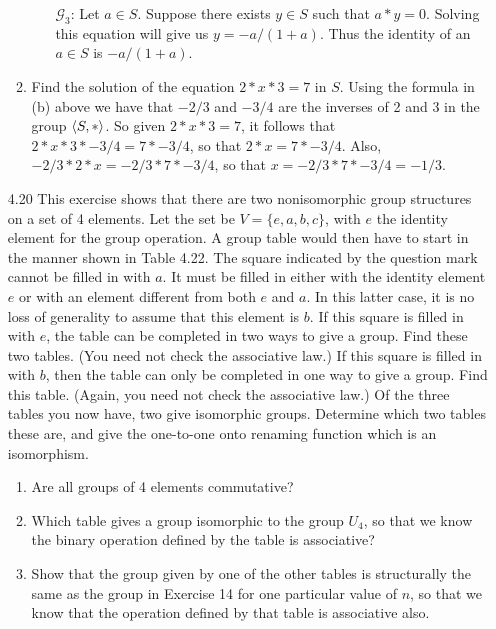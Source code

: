 \begin{enumerate}
\begin{enumerate}
\begin{enumerate}
			         \item[$\mathscr{G}_3$:] Let $a \in S$. Suppose there exists
                                          $y \in S$ such that $a * y = 0$. 
                                          Solving this equation will give us
                                          $y = -a/(1 + a)$. Thus the identity of
                                          an $a \in S$ is $-a/(1 + a)$.
		\end{enumerate}
         \item Find the solution of the equation $2 * x * 3 = 7$ in $S$. Using 
               the formula in (b) above we have that $-2/3$ and $-3/4$ are the 
               inverses of 2 and 3 in the group $\langle S, * \rangle$. So given
               $2 * x * 3 = 7$, it follows that $2 * x * 3 * -3/4 = 7 * -3/4$, 
               so that $2 * x = 7 * -3/4$. Also, $-2/3 *2* x = -2/3 * 7 * -3/4$,
               so that $x = -2/3 * 7 * -3/4 = -1/3$.
      \end{enumerate}
   \item[4.20] This exercise shows that there are two nonisomorphic group
               structures on a set of 4 elements. Let the set be
               $V = \{e, a, b, c\}$, with $e$ the identity element for the group
               operation. A group table would then have to start in the manner
               shown in Table 4.22. The square indicated by the question mark
               cannot be filled in with $a$. It must be filled in either with 
               the identity element $e$ or with an element different from both
               $e$ and $a$. In this latter case, it is no loss of generality to
               assume that this element is $b$. If this square is filled in with
               $e$, the table can be completed in two ways to give a group. Find
               these two tables. (You need not check the associative law.) If
               this square is filled in with $b$, then the table can only be
               completed in one way to give a group. Find this table. (Again, 
               you need not check the associative law.) Of the three tables you
               now have, two give isomorphic groups. Determine which two tables
               these are, and give the one-to-one onto renaming function which
               is an isomorphism.
      \begin{enumerate}
         \item Are all groups of 4 elements commutative?
         \item Which table gives a group isomorphic to the group $U_4$, so that
               we know the binary operation defined by the table is associative?
         \item Show that the group given by one of the other tables is
               structurally the same as the group in Exercise 14 for one
               particular value of $n$, so that we know that the operation
               defined by that table is associative also.
      \end{enumerate}


\end{enumerate}

